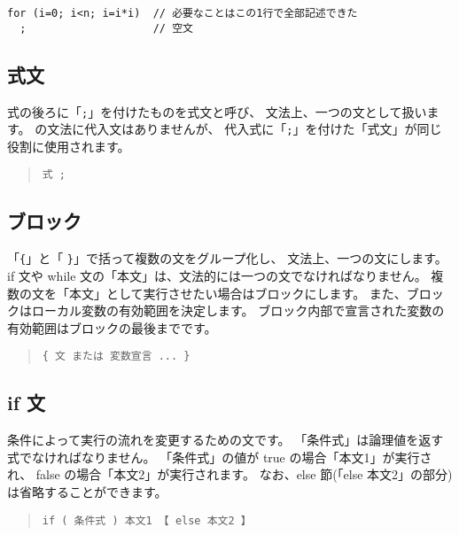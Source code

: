 \begin{mylist}
\begin{verbatim}
for (i=0; i<n; i=i*i)  // 必要なことはこの1行で全部記述できた
  ;                    // 空文
\end{verbatim}
\end{mylist}

\subsection{式文}

式の後ろに「\verb/;/」を付けたものを式文と呼び、
文法上、一つの文として扱います。
\cmml の文法に代入文はありませんが、
代入式に「\verb/;/」を付けた「式文」が同じ役割に使用されます。

\begin{quote}
\begin{verbatim}
式 ;
\end{verbatim}
\end{quote}

\subsection{ブロック}

「\verb/{/」と「 \verb/}/」で括って複数の文をグループ化し、
文法上、一つの文にします。
if 文や while 文の「本文」は、文法的には一つの文でなければなりません。
複数の文を「本文」として実行させたい場合はブロックにします。
また、ブロックはローカル変数の有効範囲を決定します。
ブロック内部で宣言された変数の有効範囲はブロックの最後までです。

\begin{quote}
\begin{verbatim}
{ 文 または 変数宣言 ... }
\end{verbatim}
\end{quote}

\subsection{if 文}

条件によって実行の流れを変更するための文です。
「条件式」は論理値を返す式でなければなりません。
「条件式」の値が true の場合「本文1」が実行され、
false の場合「本文2」が実行されます。
なお、else 節(「else 本文2」の部分)は省略することができます。

\begin{quote}
\begin{verbatim}
if ( 条件式 ) 本文1 【 else 本文2 】 
\end{verbatim}
\end{quote}

